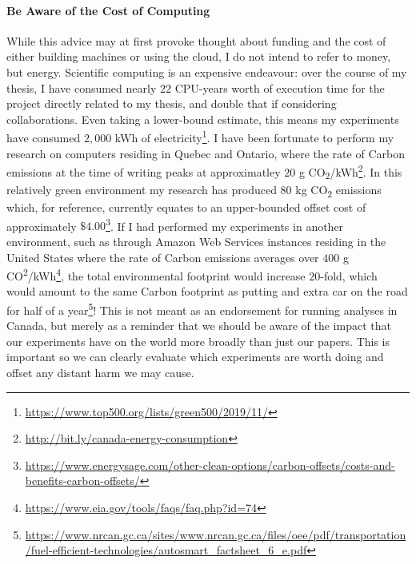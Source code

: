 \paragraph*{Be Aware of the Cost of Computing}
While this advice may at first provoke thought about funding and the cost of either building machines or using the
cloud, I do not intend to refer to money, but energy. Scientific computing is an expensive endeavour: over the course
of my thesis, I have consumed nearly $22$ CPU-years worth of execution time for the project directly related to my
thesis, and double that if considering collaborations. Even taking a lower-bound estimate, this means my experiments
have consumed $2,000$ kWh of electricity\footnote{\url{https://www.top500.org/lists/green500/2019/11/}}. I have been
fortunate to perform my research on computers residing in Quebec and Ontario, where the rate of Carbon emissions at
the time of writing peaks at approximatley $20$ g CO\textsubscript{2}/kWh\footnote{\url{http://bit.ly/canada-energy-consumption}}.
In this relatively green environment my research has produced $80$ kg CO\textsubscript{2} emissions which, for
reference, currently equates to an upper-bounded offset cost of approximately $\$4.00$\footnote{\url{https://www.energysage.com/other-clean-options/carbon-offsets/costs-and-benefits-carbon-offsets/}}.
If I had performed my experiments in another environment, such as through Amazon Web Services instances residing in
the United States where the rate of Carbon emissions averages over $400$ g CO\textsuperscript{2}/kWh\footnote{\url{https://www.eia.gov/tools/faqs/faq.php?id=74}},
the total environmental footprint would increase $20$-fold, which would amount to the same Carbon footprint as putting
and extra car on the road for half of a year\footnote{\url{https://www.nrcan.gc.ca/sites/www.nrcan.gc.ca/files/oee/pdf/transportation/fuel-efficient-technologies/autosmart_factsheet_6_e.pdf}}!
This is not meant as an endorsement for running analyses in Canada, but merely as a reminder that we should be aware
of the impact that our experiments have on the world more broadly than just our papers. This is important so we can
clearly evaluate which experiments are worth doing and offset any distant harm we may cause.

